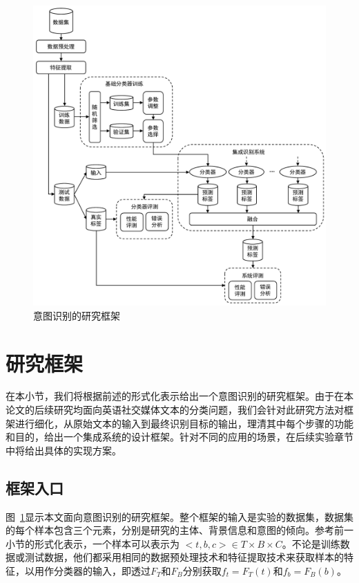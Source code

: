 \begin{figure}[H]
  \centering
  \includegraphics[width=\textwidth]{img/framework.pdf}
  \caption{意图识别的研究框架}
  \label{fig:framework}
\end{figure}

\section{研究框架}

在本小节，我们将根据前述的形式化表示给出一个意图识别的研究框架。由于在本论文的后续研究均面向英语社交媒体文本的分类问题，我们会针对此研究方法对框架进行细化，从原始文本的输入到最终识别目标的输出，理清其中每个步骤的功能和目的，给出一个集成系统的设计框架。针对不同的应用的场景，在后续实验章节中将给出具体的实现方案。

\subsection{框架入口}

图~\ref{fig:framework}显示本文面向意图识别的研究框架。整个框架的输入是实验的数据集，数据集的每个样本包含三个元素，分别是研究的主体、背景信息和意图的倾向。参考前一小节的形式化表示，一个样本可以表示为 $<t, b, c> \in T \times B \times C$。不论是训练数据或测试数据，他们都采用相同的数据预处理技术和特征提取技术来获取样本的特征，以用作分类器的输入，即透过$F_T$和$F_B$分别获取$f_t=F_T(t)$和$f_b=F_B(b)$。

